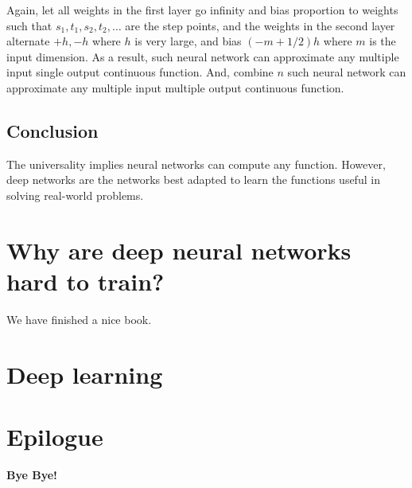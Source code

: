 \documentclass[]{book}
\begin{document}
Again, let all weights in the first layer go infinity and bias
proportion to weights such that \(s_1, t_1, s_2, t_2, \ldots\) are the
step points, and the weights in the second layer alternate \(+h, -h\)
where \(h\) is very large, and bias \((-m + 1/2)h\) where \(m\) is the
input dimension. As a result, such neural network can approximate any
multiple input single output continuous function. And, combine \(n\)
such neural network can approximate any multiple input multiple output
continuous function.

\section{Conclusion}\label{conclusion}

The universality implies neural networks can compute any function.
However, deep networks are the networks best adapted to learn the
functions useful in solving real-world problems.

\chapter{Why are deep neural networks hard to train?}\label{dpht}

We have finished a nice book.

\chapter{Deep learning}\label{dplt}

\chapter*{Epilogue}\label{epilogue}

\textbf{Bye Bye!}


\end{document}

